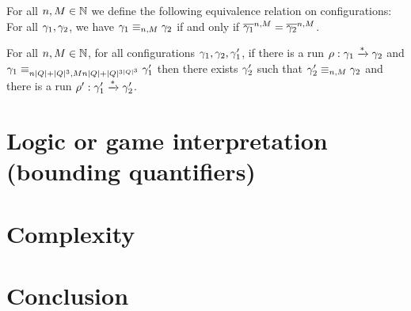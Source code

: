 \documentclass[a4paper,UKenglish,cleveref, autoref, thm-restate]{lipics-v2021}
\begin{document}
	
	For all $n, M \in \nats$ we define the following equivalence relation on configurations: 
	For all $\config_1, \config_2$, we have $\config_1 \equiv_{n,M} \config_2$ if and only if $\configapprox{n}{M}{\config_1} = \configapprox{n}{M}{\config_2}$.
	
	

	\begin{lemma}
		For all $n, M \in \nats$, for all configurations $\config_1, \config_2, \config_1'$, if there is a run $\run : \config_1 \xrightarrow{*} \config_2$ and $\config_1 \equiv_{n\size{Q}+\size{Q}^3,Mn\size{Q}+\size{Q}^{3\size{Q}^3}} \config'_1$ then there exists $\config'_2$ such that $\config'_2 \equiv_{n,M} \config_2$ and there is a run $\run' : \config_1' \xrightarrow{*} \config_2'$.
	\end{lemma}
	
	\section{Logic or game interpretation (bounding quantifiers)}
	
	\section{Complexity}
	
	\section{Conclusion}
\end{document}
